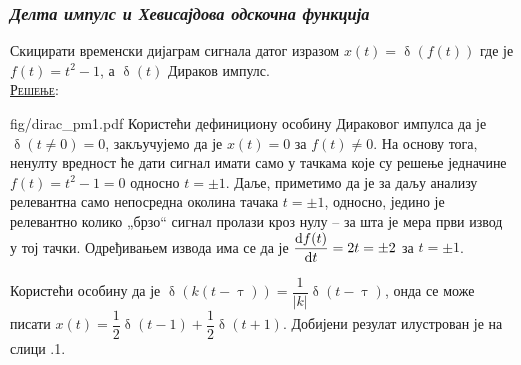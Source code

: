 \subsubsection{\textit{Делта импулс и Хевисајдова одскочна функција}}
\noindent
\PID 
Скицирати временски дијаграм сигнала датог изразом $x(t) = \updelta(f(t))$ где је 
$f(t) = t^2 - 1$, а
$\updelta(t)$ Дираков импулс. \\[2mm]

\textsc{\underline{Решење}}: 

\begin{slikaDesno}
[1]
[$t^2 - 1$ (- - -), $\updelta(t^2 - 1)$ (---)]
{fig/dirac_pm1.pdf}
Користећи дефинициону особину Дираковог импулса да је $\updelta(t \neq 0) = 0$, 
закључујемо да је $x(t) = 0$ за $f(t) \neq 0$. На основу тога, ненулту вредност ће дати сигнал имати 
само у тачкама које су решење једначине $f(t) = t^2 - 1 = 0$ односно $t = \pm 1$.  
Даље, приметимо да је за даљу анализу релевантна само непосредна околина 
тачака $t = \pm 1$, односно, једино је релевантно колико „брзо“ сигнал пролази
кроз нулу -- за шта је мера први извод у тој тачки. Одређивањем извода  има се да је 
$\dfrac{{\rm d} f(t)}{{\rm d} t} = 2t = \pm 2$ за $t = \pm 1$. 
\end{slikaDesno}
Користећи особину да је $\updelta( k(t - \uptau) ) = \dfrac{1}{|k|} \updelta(t - \uptau)$, онда 
се може писати 
${x(t) = \dfrac12 \updelta(t - 1) + \dfrac12 \updelta(t + 1)}$. Добијени резулат илустрован је на слици 
\ID.1. 